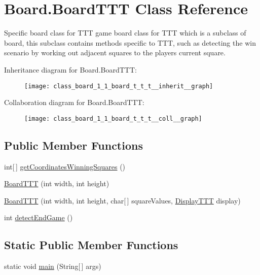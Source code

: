 \hypertarget{class_board_1_1_board_t_t_t}{}\section{Board.\+Board\+T\+T\+T Class Reference}
\label{class_board_1_1_board_t_t_t}


Specific board class for T\+T\+T game board class for T\+T\+T which is a subclass of board, this subclass contains methods specific to T\+T\+T, such as detecting the win scenario by working out adjacent squares to the players current square.  




Inheritance diagram for Board.\+Board\+T\+T\+T\+:\nopagebreak
\begin{figure}[H]
\begin{center}
\leavevmode
\texttt{[image: class\_board\_1\_1\_board\_t\_t\_t\_\_inherit\_\_graph]}
\end{center}
\end{figure}


Collaboration diagram for Board.\+Board\+T\+T\+T\+:\nopagebreak
\begin{figure}[H]
\begin{center}
\leavevmode
\texttt{[image: class\_board\_1\_1\_board\_t\_t\_t\_\_coll\_\_graph]}
\end{center}
\end{figure}
\subsection*{Public Member Functions}
\begin{DoxyCompactItemize}
\item 
int\mbox{[}$\,$\mbox{]} \hyperlink{class_board_1_1_board_t_t_t_a14ae6a700a6f83643afd3da120c1ee26}{get\+Coordinates\+Winning\+Squares} ()
\item 
\hyperlink{class_board_1_1_board_t_t_t_ac79a9beb148634225ef350d3ca0628ad}{Board\+T\+T\+T} (int width, int height)
\item 
\hyperlink{class_board_1_1_board_t_t_t_a3a5fc9e11157089f888727ba696fc2e4}{Board\+T\+T\+T} (int width, int height, char\mbox{[}$\,$\mbox{]} square\+Values, \hyperlink{class_display_1_1_display_t_t_t}{Display\+T\+T\+T} display)
\item 
int \hyperlink{class_board_1_1_board_t_t_t_a08f36da4210111d8f129be28a550334e}{detect\+End\+Game} ()
\end{DoxyCompactItemize}
\subsection*{Static Public Member Functions}
\begin{DoxyCompactItemize}
\item 
static void \hyperlink{class_board_1_1_board_t_t_t_a1b62648f4ca1d4a074767027b9c8eec0}{main} (String\mbox{[}$\,$\mbox{]} args)
\end{DoxyCompactItemize}
